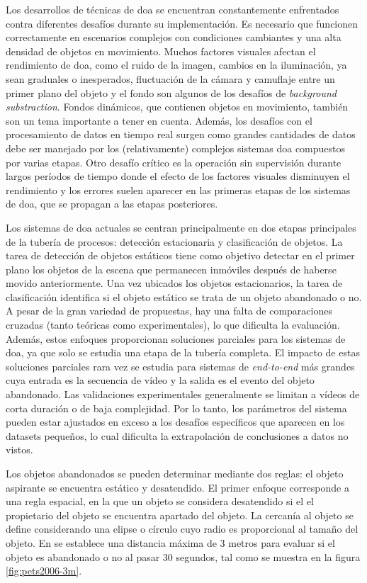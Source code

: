 Los desarrollos de técnicas de \gls{doa} se encuentran constantemente enfrentados contra diferentes desafíos durante su implementación. Es necesario que funcionen correctamente en escenarios complejos con condiciones cambiantes y una alta densidad de objetos en movimiento. Muchos factores visuales afectan el rendimiento de \gls{doa}, como el ruido de la imagen, cambios en la iluminación, ya sean graduales o inesperados, fluctuación de la cámara y camuflaje entre un primer plano del objeto y el fondo son algunos de los desafíos de \textit{background substraction}. Fondos dinámicos, que contienen objetos en movimiento, también son un tema importante a tener en cuenta. Además, los desafíos con el procesamiento de datos en tiempo real surgen como grandes cantidades de datos debe ser manejado por los (relativamente) complejos sistemas \gls{doa} compuestos por varias etapas. Otro desafío crítico es la operación sin supervisión durante largos períodos de tiempo donde el efecto de los factores visuales disminuyen el rendimiento y los errores suelen aparecer en las primeras etapas de los sistemas de \gls{doa}, que se propagan a las etapas posteriores.

Los sistemas de \gls{doa} actuales se centran principalmente en dos etapas principales de la tubería de procesos: detección estacionaria y clasificación de objetos. La tarea de detección de objetos estáticos tiene como objetivo detectar en el primer plano los objetos de la escena que permanecen inmóviles después de haberse movido anteriormente. Una vez ubicados los objetos estacionarios, la tarea de clasificación identifica si el objeto estático se trata de un objeto abandonado o no. A pesar de la gran variedad de propuestas, hay una falta de comparaciones cruzadas (tanto teóricas como experimentales), lo que dificulta la evaluación. Además, estos enfoques proporcionan soluciones parciales para los sistemas de \gls{doa}, ya que solo se estudia una etapa de la tubería completa. El impacto de estas soluciones parciales rara vez se estudia para sistemas de \textit{end-to-end} más grandes  cuya entrada es la secuencia de vídeo y la salida es el evento del objeto abandonado. Las validaciones experimentales generalmente se limitan a vídeos de corta duración o de baja complejidad. Por lo tanto, los parámetros del sistema pueden estar ajustados en exceso a los desafíos específicos que aparecen en los datasets pequeños, lo cual dificulta la extrapolación de conclusiones a datos no vistos.

Los objetos abandonados se pueden determinar mediante dos reglas: el objeto aspirante se encuentra estático y desatendido. El primer enfoque corresponde a una regla espacial, en la que un objeto se considera desatendido si el el propietario del objeto se encuentra apartado del objeto. La cercanía al objeto se define considerando una elipse o círculo cuyo radio es proporcional al tamaño del objeto. En \cite{Lv06leftluggage} se establece una distancia máxima de 3 metros para evaluar si el objeto es abandonado o no al pasar 30 segundos, tal como se muestra en la figura \ref{fig:pets2006-3m}.

